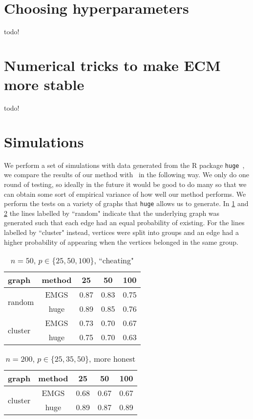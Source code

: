 \documentclass{scrartcl}
\begin{document}
\section{Choosing hyperparameters}
todo!

\section{Numerical tricks to make ECM more stable}
todo!

\section{Simulations}
We perform a set of simulations with data generated from the R package \texttt{huge}~\cite{huge2020}, we compare the results of our method with~\cite{mein2006} in the following way.
We only do one round of testing, so ideally in the future it would be good to
do many so that we can obtain some sort of empirical variance of how well our
method performs.
We perform the tests on a variety of graphs that \texttt{huge} allows us to generate.
In \cref{tab:cheat} and \cref{tab:honest} the lines labelled by ``random" indicate that the
underlying graph was generated such that each edge had an equal probability of
existing. For the lines labelled by ``cluster" instead, vertices were split
into groups and an edge had a higher probability of appearing when the vertices
belonged in the same group.
\begin{table}
	\centering
	\small
	\caption{$n=50$, $p \in \{25, 50, 100\}$, ``cheating"}\label{tab:cheat}
	\begin{tabular}{|l||c|c|c|c|}
		\hline
		graph                    & method & 25   & 50   & 100  \\
		\hline
		\multirow{2}{*}{random}  & EMGS   & 0.87 & 0.83 & 0.75 \\
		                         & huge   & 0.89 & 0.85 & 0.76 \\
		\hline
		\multirow{2}{*}{cluster} & EMGS   & 0.73 & 0.70 & 0.67 \\
		                         & huge   & 0.75 & 0.70 & 0.63 \\
		\hline
	\end{tabular}
\end{table}
\begin{table}
	\centering
	\small
	\caption{$n=200$, $p \in \{25, 35, 50\}$, more honest}\label{tab:honest}
	\begin{tabular}{|l||c|c|c|c|}
		\hline
		graph                    & method & 25   & 50   & 100  \\
		\hline
		\multirow{2}{*}{cluster} & EMGS   & 0.68 & 0.67 & 0.67 \\
		                         & huge   & 0.89 & 0.87 & 0.89 \\
		\hline
	\end{tabular}
\end{table}
\end{document}
